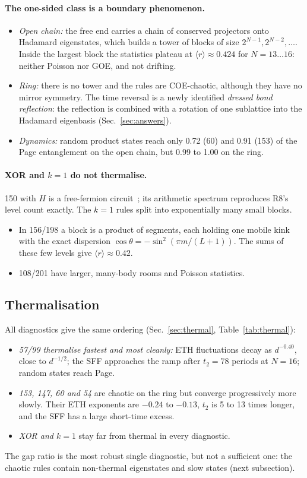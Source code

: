 \paragraph{The one-sided class is a boundary phenomenon.}
\begin{itemize}
\item \emph{Open chain:} the free end carries a chain of conserved projectors onto Hadamard eigenstates, which builds a
  tower of blocks of size $2^{N-1},2^{N-2},\ldots$. Inside the largest block the statistics plateau at
  $\langle r\rangle\approx0.424$ for $N=13\ldots16$: neither Poisson nor GOE, and not drifting.
\item \emph{Ring:} there is no tower and the rules are COE-chaotic, although they have no mirror symmetry. The time
  reversal is a newly identified \emph{dressed bond reflection}: the reflection is combined with a rotation of one
  sublattice into the Hadamard eigenbasis (Sec.~\ref{sec:answers}).
\item \emph{Dynamics:} random product states reach only 0.72 (60) and 0.91 (153) of the Page entanglement on the open
  chain, but 0.99 to 1.00 on the ring.
\end{itemize}

\paragraph{XOR and $k=1$ do not thermalise.} 150 with $H$ is a free-fermion circuit~\cite{hillberry2024}; its
arithmetic spectrum reproduces R8's level count exactly. The $k=1$ rules split into exponentially many small blocks.
\begin{itemize}
\item In 156/198 a block is a product of segments, each holding one mobile kink with the exact dispersion
  $\cos\theta=-\sin^2(\pi m/(L+1))$. The sums of these few levels give $\langle r\rangle\approx0.42$.
\item 108/201 have larger, many-body rooms and Poisson statistics.
\end{itemize}

\subsection{Thermalisation}
All diagnostics give the same ordering (Sec.~\ref{sec:thermal}, Table~\ref{tab:thermal}):
\begin{itemize}
\item \emph{57/99 thermalise fastest and most cleanly:} ETH fluctuations decay as $d^{-0.40}$, close to $d^{-1/2}$; the
  SFF approaches the ramp after $t_2=78$ periods at $N=16$; random states reach Page.
\item \emph{153, 147, 60 and 54} are chaotic on the ring but converge progressively more slowly. Their ETH exponents
  are $-0.24$ to $-0.13$, $t_2$ is 5 to 13 times longer, and the SFF has a large short-time excess.
\item \emph{XOR and $k=1$} stay far from thermal in every diagnostic.
\end{itemize}
The gap ratio is the most robust single diagnostic, but not a sufficient one: the chaotic rules contain non-thermal
eigenstates and slow states (next subsection).

